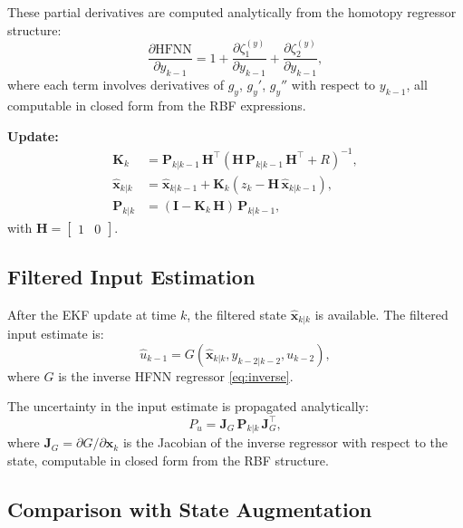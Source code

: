 \documentclass[lettersize,journal]{IEEEtran}
\begin{document}
These partial derivatives are computed analytically from the homotopy regressor structure:
\begin{equation}
\label{eq:dHFNN_dy}
\frac{\partial \text{HFNN}}{\partial y_{k-1}} = 1 + \frac{\partial \zeta_1^{(y)}}{\partial y_{k-1}} + \frac{\partial \zeta_2^{(y)}}{\partial y_{k-1}},
\end{equation}
where each term involves derivatives of $g_y$, $g_y'$, $g_y''$ with respect to $y_{k-1}$, all computable in closed form from the RBF expressions.

\textbf{Update:}
\begin{align}
\mathbf{K}_k &= \mathbf{P}_{k|k-1} \, \mathbf{H}^\top \left(\mathbf{H} \, \mathbf{P}_{k|k-1} \, \mathbf{H}^\top + R\right)^{-1}, \label{eq:ekf_gain} \\
\hat{\mathbf{x}}_{k|k} &= \hat{\mathbf{x}}_{k|k-1} + \mathbf{K}_k \left(z_k - \mathbf{H} \, \hat{\mathbf{x}}_{k|k-1}\right), \label{eq:ekf_update_state} \\
\mathbf{P}_{k|k} &= (\mathbf{I} - \mathbf{K}_k \, \mathbf{H}) \, \mathbf{P}_{k|k-1}, \label{eq:ekf_update_cov}
\end{align}
with $\mathbf{H} = \begin{bmatrix} 1 & 0 \end{bmatrix}$.

\subsection{Filtered Input Estimation}

After the EKF update at time $k$, the filtered state $\hat{\mathbf{x}}_{k|k}$ is available. The filtered input estimate is:
\begin{equation}
\label{eq:filtered_input}
\hat{u}_{k-1} = G(\hat{\mathbf{x}}_{k|k}, \hat{y}_{k-2|k-2}, u_{k-2}),
\end{equation}
where $G$ is the inverse HFNN regressor \eqref{eq:inverse}.

The uncertainty in the input estimate is propagated analytically:
\begin{equation}
\label{eq:input_uncertainty}
P_{u} = \mathbf{J}_G \, \mathbf{P}_{k|k} \, \mathbf{J}_G^\top,
\end{equation}
where $\mathbf{J}_G = \partial G / \partial \mathbf{x}_k$ is the Jacobian of the inverse regressor with respect to the state, computable in closed form from the RBF structure.

\subsection{Comparison with State Augmentation}
\end{document}
